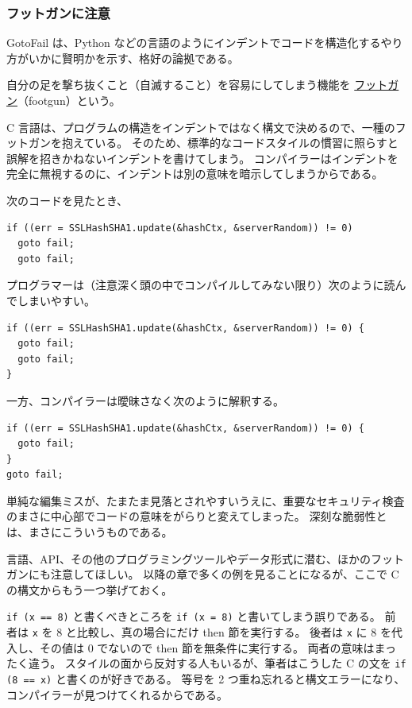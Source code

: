 \documentclass[uplatex]{jsarticle}
\def\label#1{}%
\begin{document}
\subsubsection{フットガンに注意}

GotoFail は、Python などの言語のようにインデントでコードを構造化するやり方がいかに賢明かを示す、格好の論拠である。

\begin{dfn}[フットガン]\label{dfn:ch8-footgun}
自分の足を撃ち抜くこと（自滅すること）を容易にしてしまう機能を \underline{フットガン}（footgun）という。
\end{dfn}

C 言語は、プログラムの構造をインデントではなく構文で決めるので、一種のフットガンを抱えている。
そのため、標準的なコードスタイルの慣習に照らすと誤解を招きかねないインデントを書けてしまう。
コンパイラーはインデントを完全に無視するのに、インデントは別の意味を暗示してしまうからである。

\begin{exa}[誤解を招くインデント]\label{exa:ch8-misleading-indentation}
次のコードを見たとき、
\begin{verbatim}
if ((err = SSLHashSHA1.update(&hashCtx, &serverRandom)) != 0)
  goto fail;
  goto fail;
\end{verbatim}
プログラマーは（注意深く頭の中でコンパイルしてみない限り）次のように読んでしまいやすい。
\begin{verbatim}
if ((err = SSLHashSHA1.update(&hashCtx, &serverRandom)) != 0) {
  goto fail;
  goto fail;
}
\end{verbatim}
一方、コンパイラーは曖昧さなく次のように解釈する。
\begin{verbatim}
if ((err = SSLHashSHA1.update(&hashCtx, &serverRandom)) != 0) {
  goto fail;
}
goto fail;
\end{verbatim}
\end{exa}

単純な編集ミスが、たまたま見落とされやすいうえに、重要なセキュリティ検査のまさに中心部でコードの意味をがらりと変えてしまった。
深刻な脆弱性とは、まさにこういうものである。

言語、API、その他のプログラミングツールやデータ形式に潜む、ほかのフットガンにも注意してほしい。
以降の章で多くの例を見ることになるが、ここで C の構文からもう一つ挙げておく。

\begin{exa}[代入と比較の取り違え]\label{exa:ch8-assignment-vs-comparison}
\texttt{if (x == 8)} と書くべきところを \texttt{if (x = 8)} と書いてしまう誤りである。
前者は \texttt{x} を 8 と比較し、真の場合にだけ then 節を実行する。
後者は \texttt{x} に 8 を代入し、その値は 0 でないので then 節を無条件に実行する。
両者の意味はまったく違う。
スタイルの面から反対する人もいるが、筆者はこうした C の文を \texttt{if (8 == x)} と書くのが好きである。
等号を 2 つ重ね忘れると構文エラーになり、コンパイラーが見つけてくれるからである。
\end{exa}
\end{document}
